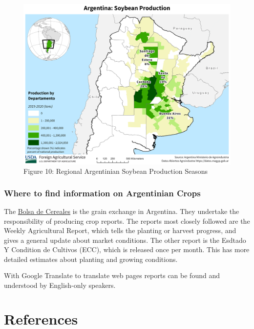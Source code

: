 \documentclass[
  letterpaper,
  DIV=11,
  numbers=noendperiod]{scrreprt}
\begin{document}
\begin{figure}

{\centering \includegraphics{assets/Argentina_Departments_Soybean.png}

}

\caption{Figure 10: Regional Argentinian Soybean Production Seasons}

\end{figure}

\hypertarget{where-to-find-information-on-argentinian-crops}{%
\subsection{Where to find information on Argentinian
Crops}\label{where-to-find-information-on-argentinian-crops}}

The \href{https://www.bolsadecereales.com/}{Bolsa de Cereales} is the
grain exchange in Argentina. They undertake the responsibility of
producing crop reports. The reports most closely followed are the Weekly
Agricultural Report, which tells the planting or harvest progress, and
gives a general update about market conditions. The other report is the
Esdtado Y Condition de Cultivos (ECC), which is released once per month.
This has more detailed estimates about planting and growing conditions.

With Google Translate to translate web pages reports can be found and
understood by English-only speakers.


\hypertarget{references-2}{%
\chapter*{References}\label{references-2}}
\end{document}
